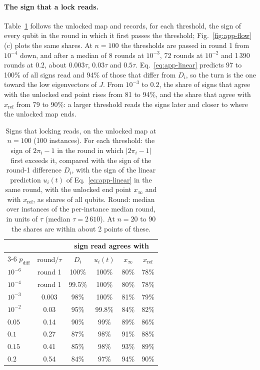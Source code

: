 \paragraph{The sign that a lock reads.} Table~\ref{tab:app-read} follows the unlocked map and records, for each threshold, the sign of every qubit in the round in which it first passes the threshold; Fig.~\ref{fig:app-flow}(c) plots the same shares. At $n=100$ the thresholds are passed in round 1 from $10^{-4}$ down, and after a median of 8 rounds at $10^{-3}$, 72 rounds at $10^{-2}$ and 1\,390 rounds at $0.2$, about $0.003\tau$, $0.03\tau$ and $0.5\tau$. Eq.~\eqref{eq:app-linear} predicts 97 to 100\% of all signs read and 94\% of those that differ from $D_i$, so the turn is the one toward the low eigenvectors of $J$. From $10^{-3}$ to $0.2$, the share of signs that agree with the unlocked end point rises from 81 to 94\%, and the share that agree with $x_{\mathrm{ref}}$ from 79 to 90\%: a larger threshold reads the signs later and closer to where the unlocked map ends.

\begin{table}[ht]
\centering
\small
\caption{Signs that locking reads, on the unlocked map at $n=100$ (100 instances). For each threshold: the sign of $2\pi_i-1$ in the round in which $|2\pi_i-1|$ first exceeds it, compared with the sign of the round-1 difference $D_i$, with the sign of the linear prediction $u_i(t)$ of Eq.~\eqref{eq:app-linear} in the same round, with the unlocked end point $x_\infty$ and with $x_{\mathrm{ref}}$, as shares of all qubits. Round: median over instances of the per-instance median round, in units of $\tau$ (median $\tau=2\,610$). At $n=20$ to $90$ the shares are within about 2 points of these.}
\label{tab:app-read}
\begin{tabular}{lccccc}
\toprule
 & & \multicolumn{4}{c}{sign read agrees with} \\
\cmidrule(lr){3-6}
$p_{\mathrm{diff}}$ & round$/\tau$ & $D_i$ & $u_i(t)$ & $x_\infty$ & $x_{\mathrm{ref}}$ \\
\midrule
$10^{-6}$ & round 1 & 100\% & 100\% & 80\% & 78\% \\
$10^{-4}$ & round 1 & 99.5\% & 100\% & 80\% & 78\% \\
$10^{-3}$ & 0.003 & 98\% & 100\% & 81\% & 79\% \\
$10^{-2}$ & 0.03 & 95\% & 99.8\% & 84\% & 82\% \\
$0.05$ & 0.14 & 90\% & 99\% & 89\% & 86\% \\
$0.1$ & 0.27 & 87\% & 98\% & 91\% & 88\% \\
$0.15$ & 0.41 & 85\% & 98\% & 93\% & 89\% \\
$0.2$ & 0.54 & 84\% & 97\% & 94\% & 90\% \\
\bottomrule
\end{tabular}
\end{table}

